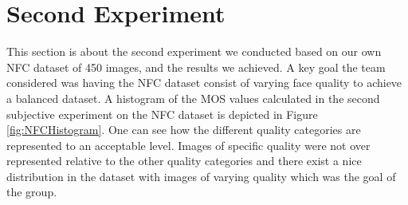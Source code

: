 \begin{table}[h]
\caption{All correlation coefficients on the three datasets between ISO Metrics, FaceQnet, FIQMs Weighted AVG and the subjective scores. The `X'-symbol indicated the correlation coefficients that had a p-value higher than 0.05 and were therefore ignored. The coefficients were not calculated where the `-' symbol is placed.}
\label{tab:corrcoeff}
\end{table}


\section{Second Experiment}
\label{sec:secondExperiment}
This section is about the second experiment we conducted based on our own NFC dataset of 450 images, and the results we achieved. A key goal the team considered was having the NFC dataset consist of varying face quality to achieve a balanced dataset. A histogram of the MOS values calculated in the second subjective experiment on the NFC dataset is depicted in Figure \ref{fig:NFCHistogram}. One can see how the different quality categories are represented to an acceptable level. Images of specific quality were not over represented relative to the other quality categories and there exist a nice distribution in the dataset with images of varying quality which was the goal of the group. 

